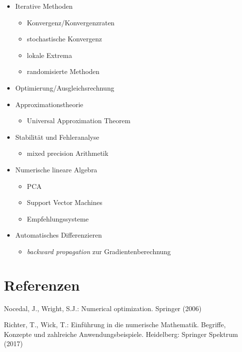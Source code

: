 \documentclass[
]{book}
\providecommand{\tightlist}{%
  \setlength{\itemsep}{0pt}\setlength{\parskip}{0pt}}
\newenvironment{cslreferences}%
  {}%
  {\par}
\theoremstyle{definition}
\theoremstyle{definition}
\theoremstyle{definition}
\theoremstyle{definition}
\theoremstyle{remark}
\begin{document}
\begin{itemize}
\item
  Iterative Methoden

  \begin{itemize}
  \tightlist
  \item
    Konvergenz/Konvergenzraten
  \item
    stochastische Konvergenz
  \item
    lokale Extrema
  \item
    randomisierte Methoden
  \end{itemize}
\item
  Optimierung/Ausgleichsrechnung
\item
  Approximationstheorie

  \begin{itemize}
  \tightlist
  \item
    Universal Approximation Theorem
  \end{itemize}
\item
  Stabilität und Fehleranalyse

  \begin{itemize}
  \tightlist
  \item
    mixed precision Arithmetik
  \end{itemize}
\item
  Numerische lineare Algebra

  \begin{itemize}
  \tightlist
  \item
    PCA
  \item
    Support Vector Machines
  \item
    Empfehlungssysteme
  \end{itemize}
\item
  Automatisches Differenzieren

  \begin{itemize}
  \tightlist
  \item
    \emph{backward propagation} zur Gradientenberechnung
  \end{itemize}
\end{itemize}

\hypertarget{referenzen}{%
\chapter*{Referenzen}\label{referenzen}}

\hypertarget{refs}{}
\begin{cslreferences}
\leavevmode\hypertarget{ref-NocW06}{}%
Nocedal, J., Wright, S.J.: Numerical optimization. Springer (2006)

\leavevmode\hypertarget{ref-RicW17}{}%
Richter, T., Wick, T.: Einführung in die numerische Mathematik. Begriffe, Konzepte und zahlreiche Anwendungsbeispiele. Heidelberg: Springer Spektrum (2017)
\end{cslreferences}
\end{document}
